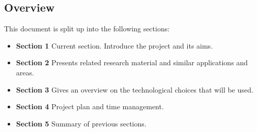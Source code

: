 \subsection{Overview}
This document is split up into the following sections:
\begin{itemize}
 \item \textbf{Section 1} Current section. Introduce the project and its aims.
 \item \textbf{Section 2} Presents related research material and similar applications and areas.
 \item \textbf{Section 3} Gives an overview on the technological choices that will be used.
 \item \textbf{Section 4} Project plan and time management.
 \item \textbf{Section 5} Summary of previous sections.
\end{itemize}


